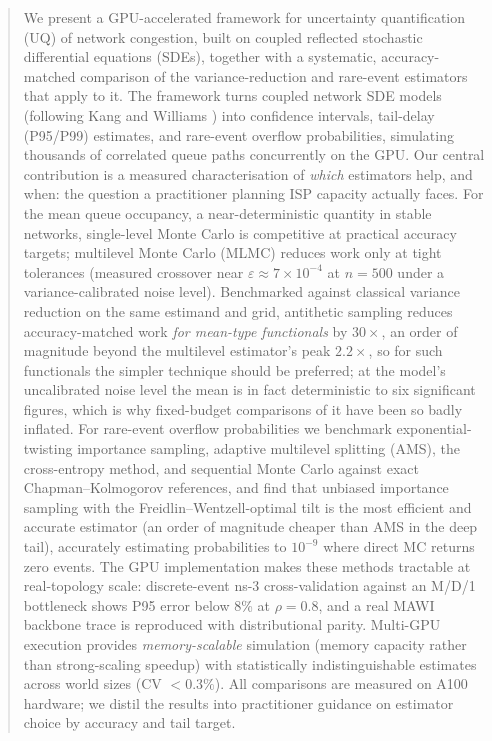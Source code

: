 \documentclass{ieeeaccess}
\begin{document}
\begin{abstract}
We present a GPU-accelerated framework for uncertainty quantification (UQ) of network
congestion, built on coupled reflected stochastic differential equations (SDEs), together with a
systematic, accuracy-matched comparison of the variance-reduction and rare-event estimators
that apply to it. The framework turns coupled network SDE models (following Kang and
Williams \cite{kang2007}) into confidence intervals, tail-delay (P95/P99) estimates, and
rare-event overflow probabilities, simulating thousands of correlated queue paths concurrently
on the GPU. Our central contribution is a measured characterisation of \emph{which} estimators
help, and when: the question a practitioner planning ISP capacity actually faces. For the mean
queue occupancy, a near-deterministic quantity in stable networks, single-level Monte Carlo is
competitive at practical accuracy targets; multilevel Monte Carlo (MLMC) reduces work only at
tight tolerances (measured crossover near $\varepsilon\approx7\times10^{-4}$ at $n{=}500$ under a variance-calibrated noise level). Benchmarked against
classical variance reduction on the same estimand and grid, antithetic sampling reduces
accuracy-matched work \emph{for mean-type functionals} by $30\times$, an order of magnitude
beyond the multilevel estimator's peak $2.2\times$, so for such functionals the simpler
technique should be preferred; at
the model's uncalibrated noise level the mean is in fact deterministic to six significant
figures, which is why fixed-budget comparisons of it have been so badly inflated. For rare-event overflow
probabilities we benchmark exponential-twisting importance sampling, adaptive multilevel
splitting (AMS), the cross-entropy method, and sequential Monte Carlo against exact
Chapman--Kolmogorov references, and find that unbiased importance sampling with the
Freidlin--Wentzell-optimal tilt is the most efficient and accurate estimator (an order of
magnitude cheaper than AMS in the deep tail), accurately estimating probabilities to $10^{-9}$
where direct MC returns zero events. The GPU
implementation makes these methods tractable at real-topology scale: discrete-event ns-3
cross-validation against an M/D/1 bottleneck shows P95 error below 8\% at $\rho{=}0.8$, and a
real MAWI backbone trace is reproduced with distributional parity. Multi-GPU execution provides
\emph{memory-scalable} simulation (memory capacity rather than strong-scaling speedup) with
statistically indistinguishable estimates across world sizes (CV $<0.3\%$). All comparisons are
measured on A100 hardware; we distil the results into practitioner guidance on estimator choice
by accuracy and tail target.
\end{abstract}
\end{document}
